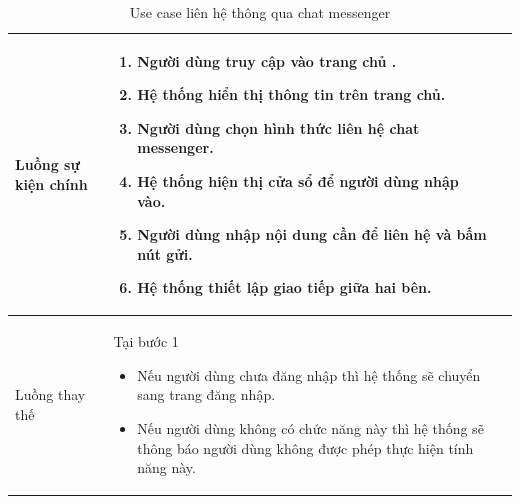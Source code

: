 \documentclass[12pt,a4paper]{article}
\begin{document}
\begin{table}[H]
\begin{tabular}{|p{3.5cm}|p{11.5cm}|c|}
            Luồng sự kiện chính & \vspace{-.8cm}\begin{enumerate}
                                                    \item Người dùng truy cập vào trang chủ .
                                                    \item Hệ thống hiển thị thông tin trên trang chủ.
                                                    \item Người dùng chọn hình thức liên hệ chat messenger.
                                                    \item Hệ thống hiện thị cửa sổ để người dùng nhập vào.
                                                    \item Người dùng nhập nội dung cần để liên hệ và bấm nút gửi.
                                                    \item Hệ thống thiết lập giao tiếp giữa hai bên.
            \end{enumerate}
            \\
            \hline
            Luồng thay thế & Tại bước 1\newline
            \vspace{-.8cm}\begin{itemize}
                              \item Nếu người dùng chưa đăng nhập thì hệ thống sẽ chuyển sang trang đăng nhập.
                              \item Nếu người dùng không có chức năng này thì hệ thống sẽ thông báo người dùng không được phép thực hiện tính năng này.
            \end{itemize}

            \\ \hline
        \end{tabular}
        \caption{Use case liên hệ thông qua chat messenger}

    \end{table}

\end{document}
